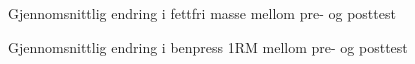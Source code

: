 \documentclass[
  letterpaper,
  DIV=11,
  numbers=noendperiod]{scrreprt}
\begin{document}
\begin{figure}


\caption{\label{fig-1}Gjennomsnittlig endring i fettfri masse mellom
pre- og posttest}

\end{figure}%

\begin{figure}


\caption{\label{fig-2}Gjennomsnittlig endring i benpress 1RM mellom pre-
og posttest}

\end{figure}%
\end{document}
